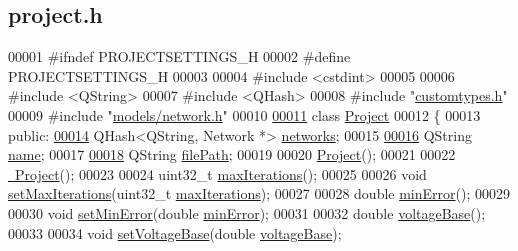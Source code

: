 \hypertarget{project_8h_source}{}\subsection{project.\+h}
\label{project_8h_source}

\begin{DoxyCode}
00001 \textcolor{preprocessor}{#ifndef PROJECTSETTINGS\_H}
00002 \textcolor{preprocessor}{#define PROJECTSETTINGS\_H}
00003 
00004 \textcolor{preprocessor}{#include <cstdint>}
00005 
00006 \textcolor{preprocessor}{#include <QString>}
00007 \textcolor{preprocessor}{#include <QHash>}
00008 \textcolor{preprocessor}{#include "\hyperlink{customtypes_8h}{customtypes.h}"}
00009 \textcolor{preprocessor}{#include "\hyperlink{network_8h}{models/network.h}"}
00010 
\hypertarget{project_8h_source_l00011}{}\hyperlink{class_project}{00011} \textcolor{keyword}{class }\hyperlink{class_project}{Project}
00012 \{
00013 \textcolor{keyword}{public}:
\hypertarget{project_8h_source_l00014}{}\hyperlink{class_project_aa98126154cab59769a431668e6f17daf}{00014}   QHash<QString, Network *> \hyperlink{class_project_aa98126154cab59769a431668e6f17daf}{networks};
00015 
\hypertarget{project_8h_source_l00016}{}\hyperlink{class_project_a82dd2d1bc38f9fd08c9a811fcaa76b38}{00016}   QString \hyperlink{class_project_a82dd2d1bc38f9fd08c9a811fcaa76b38}{name};
00017 
\hypertarget{project_8h_source_l00018}{}\hyperlink{class_project_a79f30adcefd0b72bd4ac7db724bc9531}{00018}   QString \hyperlink{class_project_a79f30adcefd0b72bd4ac7db724bc9531}{filePath};
00019 
00020   \hyperlink{class_project_aa007ecd17d5bc800e7a956cf666eea21}{Project}();
00021 
00022   \hyperlink{class_project_ad165d61b76ee86ee9c27fd987a2a7b9e}{~Project}();
00023 
00024   uint32\_t \hyperlink{class_project_ab9d6426396a75f2fcaeadcddcd0fac64}{maxIterations}();
00025 
00026   \textcolor{keywordtype}{void} \hyperlink{class_project_af2046a5d542d3e3dd51cb9cb04604e8f}{setMaxIterations}(uint32\_t \hyperlink{class_project_ab9d6426396a75f2fcaeadcddcd0fac64}{maxIterations});
00027 
00028   \textcolor{keywordtype}{double} \hyperlink{class_project_a457ed8d3b0ea5816f928977509f69a34}{minError}();
00029 
00030   \textcolor{keywordtype}{void} \hyperlink{class_project_a2cb776c39adb42a1113bf7887d0d4636}{setMinError}(\textcolor{keywordtype}{double} \hyperlink{class_project_a457ed8d3b0ea5816f928977509f69a34}{minError});
00031 
00032   \textcolor{keywordtype}{double} \hyperlink{class_project_a4e857ccb6162f57f5d72f4e7199e4573}{voltageBase}();
00033 
00034   \textcolor{keywordtype}{void} \hyperlink{class_project_a494c3e89851f754188c7abaedbf77ef6}{setVoltageBase}(\textcolor{keywordtype}{double} \hyperlink{class_project_a4e857ccb6162f57f5d72f4e7199e4573}{voltageBase});

\end{DoxyCode}
